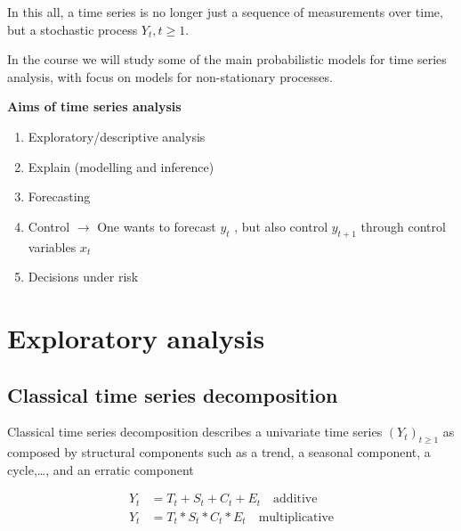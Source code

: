 \documentclass[dvipsnames,12pt]{book}
\begin{document}
                    In this all, a time series is no longer just a sequence of measurements over time, but a stochastic process \(Y_t, t \geq 1\).
    
                    In the course we will study some of the main probabilistic models for time series analysis, with focus on models for non-stationary processes.

\newpage

                \begin{remark}
                    \textbf{Aims of time series analysis}
                    \begin{enumerate}
                        \item Exploratory/descriptive analysis
                        \item Explain (modelling and inference)
                        \item Forecasting
                        \item Control \(\rightarrow\) One wants to forecast \(y_t\) , but also control \(y_{t+1}\) through control variables \(x_t\)
                        \item Decisions under risk
                    \end{enumerate}
                \end{remark}


        \section{Exploratory analysis}

            \subsection{Classical time series decomposition}
            
                Classical time series decomposition describes a univariate time series \( (Y_t)_{t \geq 1} \) as composed by structural components such as a trend, a seasonal component, a cycle,\dots, and an erratic component
                
                \begin{align}
                    Y_t & = T_t + S_t + C_t + E_t \quad \text{additive} \label{1.4eq} \\
                    Y_t & = T_t * S_t * C_t * E_t \quad \text{multiplicative} \label{1.5eq}
                \end{align}
                
\end{document}
